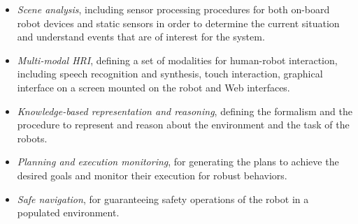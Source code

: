\begin{itemize}
\item \emph{Scene analysis}, including sensor processing procedures for both on-board robot devices and static sensors in order to determine the current situation and understand events that are of interest for the system.

\item \emph{Multi-modal HRI}, defining a set of modalities for human-robot interaction, including speech recognition and synthesis, touch interaction, graphical interface on a screen mounted on the robot and Web interfaces.

\item \emph{Knowledge-based representation and reasoning}, defining the formalism and the procedure to represent and reason about the environment and the task of the robots.

\item \emph{Planning and execution monitoring}, for generating the plans to achieve the desired goals and monitor their execution for robust behaviors.

\item \emph{Safe navigation}, for guaranteeing safety operations of the robot in a populated environment.

\end{itemize}




